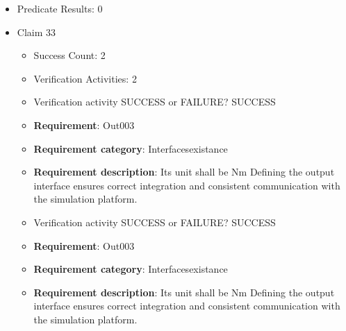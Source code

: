 \documentclass{article}
\begin{document}
\begin{itemize}
\begin{itemize}
						\item \textbf{Requirement}: Out002 
						\item \textbf{Requirement category}: Interfacesexistance 
						\item \textbf{Requirement description}: Its unit shall be Nm Defining the output interface ensures correct integration and consistent communication with the simulation platform.
					
					\item Verification activity SUCCESS or FAILURE? SUCCESS
		
						\item \textbf{Requirement}: Out002 
						\item \textbf{Requirement category}: Interfacesexistance 
						\item \textbf{Requirement description}: Its unit shall be Nm Defining the output interface ensures correct integration and consistent communication with the simulation platform.
					
				\end{itemize}
				
									    
				\item Predicate Results: 0

  				  \item Claim 33
				\begin{itemize}
			    	\item Success Count: 2 
			    	\item Verification Activities: 2
					\item Verification activity SUCCESS or FAILURE? SUCCESS
		
						\item \textbf{Requirement}: Out003 
						\item \textbf{Requirement category}: Interfacesexistance 
						\item \textbf{Requirement description}: Its unit shall be Nm Defining the output interface ensures correct integration and consistent communication with the simulation platform.
					
					\item Verification activity SUCCESS or FAILURE? SUCCESS
		
						\item \textbf{Requirement}: Out003 
						\item \textbf{Requirement category}: Interfacesexistance 
						\item \textbf{Requirement description}: Its unit shall be Nm Defining the output interface ensures correct integration and consistent communication with the simulation platform.
					

\end{itemize}
\end{itemize}
\end{document}
